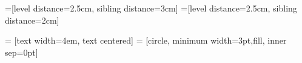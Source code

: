 \begin{comment}
\tikzstyle{level 1}=[level distance=2.5cm, sibling distance=3cm]
\tikzstyle{level 2}=[level distance=2.5cm, sibling distance=2cm]

\tikzstyle{bag} = [text width=4em, text centered]
\tikzstyle{end} = [circle, minimum width=3pt,fill, inner sep=0pt]

\begin{figure}[h!]
\centering
\begin{tikzpicture}[grow=right, sloped]
\node[bag] {1}
child {
node[bag] {$ 1+d $}        
child {
node[label=right:
{$ (1+d)^2 $}] {}
edge from parent
node[above] {$1-p$}
}
child {
node[label=right:
{$(1+d)(1+u)$}] {}
edge from parent
node[above] {$p$}
}
edge from parent 
node[above] {$1-p$}
}
child {
node[bag] {$ 1+u $}        
child {
node[label=right:
{$(1+u)(1+d)$}] {}
edge from parent
node[above] {$1-p$}
}
child {
node[label=right:
{$(1+p)^2$}] {}
edge from parent
node[above] {$p$}
}
edge from parent         
node[above] {$p$}
};
\end{tikzpicture}
\caption{Ganancias en un árbol binomial de dos pasos.}
\end{figure}

Por lo tanto, si denotamos al precio de una activo en el paso $ n \in \NN$ como $ S(n) $ tenemos que:
\[
S(n) = S(0)(1+u)^i(1+d)^{n-i} \text{ con probabilidad } { n \choose i}p^i(1-p)^{n-i},
\]
donde $ S(0) $ es el precio actual del activo. \\

\end{comment}

=[level distance=2.5cm, sibling distance=3cm]
=[level distance=2.5cm, sibling distance=2cm]

 = [text width=4em, text centered]
 = [circle, minimum width=3pt,fill, inner sep=0pt]

